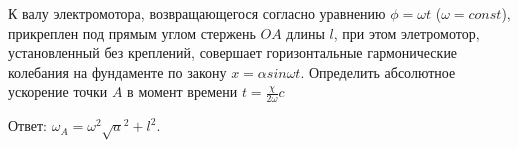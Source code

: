 К валу электромотора, возвращающегося согласно уравнению $\phi= \omega t$ ($ \omega= const $), прикреплен под прямым углом 
стержень $OA$ длины $l$, при этом элетромотор, установленный без креплений, совершает горизонтальные гармонические колебания на 
фундаменте по закону $x= \alpha sin \omega t$. Определить абсолютное ускорение точки $A$ в момент времени $t=\frac{\chi}{2\omega}c$

Ответ: $\omega_{A}=\omega^2 \sqrt a^2+l^2$.